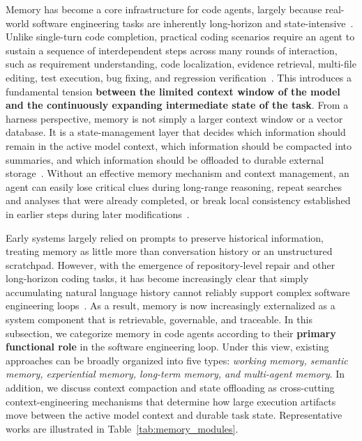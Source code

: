 \documentclass{llmxive}
\begin{document}
Memory has become a core infrastructure for code agents, largely because real-world software engineering tasks are inherently long-horizon and state-intensive~\cite{dong2025survey,huang2026rethinking}. Unlike single-turn code completion, practical coding scenarios require an agent to sustain a sequence of interdependent steps across many rounds of interaction, such as requirement understanding, code localization, evidence retrieval, multi-file editing, test execution, bug fixing, and regression verification~\cite{xia2025demystifying,zhang2025survey}. This introduces a fundamental tension \textbf{between the limited context window of the model and the continuously expanding intermediate state of the task}. 
From a harness perspective, memory is not simply a larger context window or a vector database. It is a state-management layer that decides which information should remain in the active model context, which information should be compacted into summaries, and which information should be offloaded to durable external storage~\cite{zhou2026externalization}.
Without an effective memory mechanism and context management, an agent can easily lose critical clues during long-range reasoning, repeat searches and analyses that were already completed, or break local consistency established in earlier steps during later modifications~\cite{zhang2025ragsurvey,huang2026rethinking}.




Early systems largely relied on prompts to preserve historical information, treating memory as little more than conversation history or an unstructured scratchpad. However, with the emergence of repository-level repair and other long-horizon coding tasks, it has become increasingly clear that simply accumulating natural language history cannot reliably support complex software engineering loops~\cite{jiang2026survey}. As a result, memory is now increasingly externalized as a system component that is retrievable, governable, and traceable. In this subsection, we categorize memory in code agents according to their \textbf{primary functional role} in the software engineering loop. Under this view, existing approaches can be broadly organized into five types: \textit{working memory, semantic memory, experiential memory, long-term memory, and multi-agent memory}. In addition, we discuss context compaction and state offloading as cross-cutting context-engineering mechanisms that determine how large execution artifacts move between the active model context and durable task state. Representative works are illustrated in Table~\ref{tab:memory_modules}.
\end{document}
